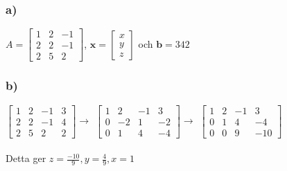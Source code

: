 \documentclass{article}
\begin{document}
\subsubsection*{a)}
$A =
    \begin{bmatrix}
        1   &   2   &   -1 \\
        2   &   2   &   -1 \\
        2   &   5   &   2   
    \end{bmatrix}$, 
$\mathbf{x} = 
    \begin{bmatrix}
        x \\
        y \\
        z
     \end{bmatrix}$ och
$\mathbf{b} = 342 $

\subsubsection*{b)}

$\begin{bmatrix}
    1 & 2 & -1 & 3 \\
    2 & 2 & -1 & 4 \\
    2 & 5 & 2  & 2  
\end{bmatrix} \rightarrow $  
$\begin{bmatrix}
    1 & 2 &-1 & 3 \\
    0 &-2 & 1 &-2 \\
    0 & 1 & 4 &-4  
\end{bmatrix} \rightarrow $
$\begin{bmatrix}
    1 & 2 &-1 & 3 \\
    0 & 1 & 4 &-4 \\
    0 & 0 & 9 &-10  
\end{bmatrix}$
\\
\\
\noindent
Detta ger $z=\frac{-10}{9}, y=\frac{4}{9}, x=1$
\end{document}

